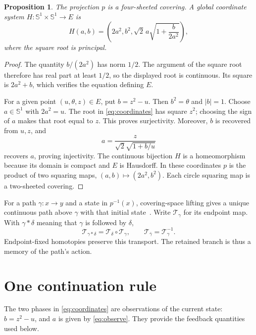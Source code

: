 \documentclass[11pt]{article}
\newtheorem{proposition}{Proposition}
\newcommand{\Sone}{\mathbb S^1}
\newcommand{\T}{\mathcal T}
\begin{document}
\begin{proposition}\label{prop:cover}
The projection $p$ is a four-sheeted covering. A global coordinate system
$H:\Sone\times\Sone\to E$ is
\begin{equation}\label{eq:coordinates}
 H(a,b)=\left(2a^2,b^2,
   \sqrt2\,a\sqrt{1+\frac{b}{2a^2}}\right),
\end{equation}
where the square root is principal.
\end{proposition}
\begin{proof}
The quantity $b/(2a^2)$ has norm $1/2$. The argument of the square root
therefore has real part at least $1/2$, so the displayed root is continuous.
Its square is $2a^2+b$, which verifies the equation defining $E$.

For a given point $(u,\theta,z)\in E$, put $b=z^2-u$. Then $b^2=\theta$
and $|b|=1$. Choose $a\in\Sone$ with $2a^2=u$. The root in
\eqref{eq:coordinates} has square $z^2$; choosing the sign of $a$ makes that
root equal to $z$. This proves surjectivity. Moreover, $b$ is recovered from
$u,z$, and
\begin{equation}\label{eq:observe}
 a=\frac{z}{\sqrt2\sqrt{1+b/u}}
\end{equation}
recovers $a$, proving injectivity. The continuous bijection $H$ is a
homeomorphism because its domain is compact and $E$ is Hausdorff.
In these coordinates $p$ is the product of two squaring maps,
$(a,b)\mapsto(2a^2,b^2)$. Each circle squaring map is a two-sheeted covering.
\end{proof}

For a path $\gamma:x\to y$ and a state in $p^{-1}(x)$, covering-space
lifting gives a unique continuous path above $\gamma$ with that initial
state~\cite[\S1.3]{hatcher}. Write $\T_\gamma$ for its endpoint map. With
$\gamma*\delta$ meaning that $\gamma$ is followed by $\delta$,
\begin{equation}\label{eq:transport}
 \T_{\gamma*\delta}=\T_\delta\circ\T_\gamma,
 \qquad \T_{\bar\gamma}=\T_\gamma^{-1}.
\end{equation}
Endpoint-fixed homotopies preserve this transport. The retained branch is
thus a memory of the path's action.

\section{One continuation rule}

The two phases in \eqref{eq:coordinates} are observations of the current
state: $b=z^2-u$, and $a$ is given by \eqref{eq:observe}. They provide the
feedback quantities used below.
\end{document}
